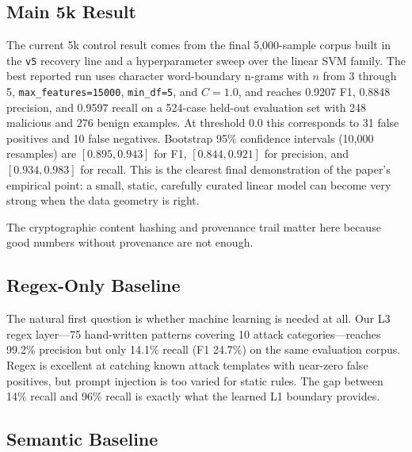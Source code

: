 \documentclass[11pt,a4paper]{article}
\begin{document}
\subsection{Main 5k Result}
\label{sec:main-result}

The current 5k control result comes from the final 5,000-sample corpus
built in the \texttt{v5} recovery line and a hyperparameter sweep over
the linear SVM family. The best reported run uses character
word-boundary n-grams with $n$ from 3 through 5,
\texttt{max\_features=15000}, \texttt{min\_df=5}, and $C=1.0$, and
reaches 0.9207 F1, 0.8848 precision, and 0.9597 recall on a 524-case
held-out evaluation set with 248 malicious and 276 benign examples. At
threshold 0.0 this corresponds to 31 false positives and 10 false
negatives. Bootstrap 95\% confidence intervals (10,000 resamples) are
$[0.895, 0.943]$ for F1, $[0.844, 0.921]$ for precision, and
$[0.934, 0.983]$ for recall. This is the clearest final demonstration
of the paper's empirical point: a small, static, carefully curated
linear model can become very strong when the data geometry is right.

The cryptographic content hashing and provenance trail matter here
because good numbers without provenance are not enough.

\subsection{Regex-Only Baseline}
\label{sec:regex}

The natural first question is whether machine learning is needed at all.
Our L3 regex layer---75 hand-written patterns covering 10 attack
categories---reaches 99.2\% precision but only 14.1\% recall (F1
24.7\%) on the same evaluation corpus. Regex is excellent at catching
known attack templates with near-zero false positives, but prompt
injection is too varied for static rules. The gap between 14\% recall
and 96\% recall is exactly what the learned L1 boundary provides.

\subsection{Semantic Baseline}
\label{sec:semantic}
\end{document}
